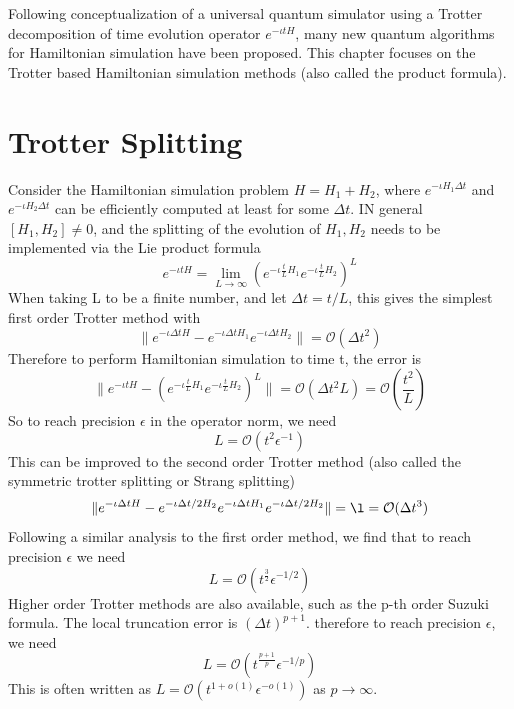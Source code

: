 \documentclass[12pt, oneside]{book}
\theoremstyle{definition}
\theoremstyle{definition}
\theoremstyle{remark}
\begin{document}
Following conceptualization of a universal quantum simulator using a Trotter decomposition of time evolution operator $e^{-\iota t H}$, many new quantum algorithms for Hamiltonian simulation have been proposed. This chapter focuses on the Trotter based Hamiltonian simulation methods (also called the product formula).

\section{Trotter Splitting}
Consider the Hamiltonian simulation problem $H=H_1+H_2$, where $e^{-\iota H_1 \Delta t}$ and $e^{-\iota H_2 \Delta t}$ can be efficiently computed at least for some $\Delta t$. IN general $[H_1,H_2]\neq 0$, and the splitting of the evolution of $H_1,H_2$ needs to be implemented via the Lie product formula
\[
e^{-\iota t H}=\lim_{L\rightarrow \infty} \left(e^{- \iota \frac{t}{L}H_1} e^{-\iota \frac{t}{L}H_2}\right)^L
\]
When taking L to be a finite number, and let $\Delta t = t/L$, this gives the simplest first order Trotter method with
\[
\|e^{-\iota \Delta t H}-e^{-\iota \Delta tH_1} e^{-\iota \Delta tH_2}\|=\mathcal{O}(\Delta t^2)
\]
Therefore to perform Hamiltonian simulation to time t, the error is
\[
\|e^{-\iota t H}-\left(e^{-\iota \frac{t}{L}H_1} e^{-\iota \frac{t}{L}H_2}\right)^L\| = \mathcal{O}(\Delta t^2L)=\mathcal{O}\left(\frac{t^2}{L}\right)
\]
So to reach precision $\epsilon$ in the operator norm, we need
\[
L=\mathcal{O}(t^2\epsilon^{-1})
\]
This can be improved to the second order Trotter method (also called the symmetric trotter splitting or Strang splitting)
\[
\| e^{-\iota \Delta t H}-e^{-\iota \Delta t/2 H_2}e^{-\iota \Delta tH_1}e^{-\iota \Delta t/2H_2}\|=\l=\mathcal{O}(\Delta t^3)
\]
Following a similar analysis to the first order method, we find that to reach precision $\epsilon$ we need
\[
L=\mathcal{O}(t^{\frac{3}{2}}\epsilon^{-1/2})
\]
Higher order Trotter methods are also available, such as the p-th order Suzuki formula. The local truncation error is $(\Delta t)^{p+1}$. therefore to reach precision $\epsilon$, we need
\[
L=\mathcal{O}(t^{\frac{p+1}{p}}\epsilon^{-1/p})
\]
This is often written as $L=\mathcal{O}(t^{1+o(1)}\epsilon^{-o(1)})$  as $p\rightarrow \infty$.
\end{document}
